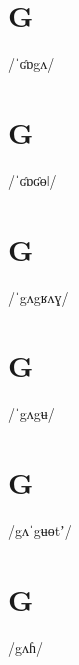 \documentclass[10pt,a4paper,twoside]{book}
\begin{document}
\section*{G}

\begin{multicols}{3}
 {/ˈʛɒgʌ/} {}
\end{multicols}

\section*{G}

\begin{multicols}{3}
 {/ˈʛɒʛɵǀ/} {}
\end{multicols}

\section*{G}

\begin{multicols}{3}
 {/ˈgʌgʁʌɣ/} {}
\end{multicols}

\section*{G}

\begin{multicols}{3}
 {/ˈgʌgʉ/} {}
\end{multicols}

\section*{G}

\begin{multicols}{3}
 {/gʌˈgʉɵtʼ/} {}
\end{multicols}

\section*{G}

\begin{multicols}{3}
 {/gʌɦ/} {}
\end{multicols}
\end{document}
